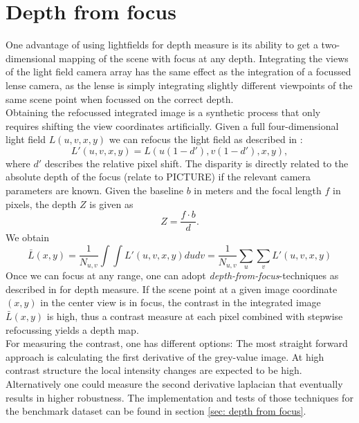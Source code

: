 \documentclass  [
  paper    = a4,
  BCOR     = 10mm,
  twoside,
  fontsize = 12pt,
  fleqn,
  toc      = bibnumbered,
  toc      = listofnumbered,
  numbers  = noendperiod,
  headings = normal,
  listof   = leveldown,
  version  = 3.03
]                                       {scrreprt}
\begin{document}
\section{Depth from focus}
\label{sec:theo depth}
One advantage of using lightfields for depth measure is its ability to get a two-dimensional mapping of the scene with focus at any depth. Integrating the views of the light field camera array has the same effect as the integration of a focussed lense camera, as the lense is simply integrating slightly different viewpoints of the same scene point when focussed on the correct depth. \\
 Obtaining the refocussed integrated image is a synthetic process that only requires shifting the view coordinates artificially. Given a full four-dimensional light field $L(u, v, x, y)$ we can refocus the light field as described in \cite{ng2005light}:
 \begin{equation}\label{eq:refocus}
L'(u, v, x, y) = L(u(1-d'), v(1-d'), x, y),
\end{equation}
where $d'$ describes the relative pixel shift. The disparity is directly related to the absolute depth of the focus (relate to PICTURE) if the relevant camera parameters are  known. Given the baseline $b$ in meters and the focal length $f$ in pixels, the depth $Z$ is given as \begin{equation}\label{key}
Z = \frac{f\cdot b}{d}.
\end{equation} 
We obtain
\begin{equation}\label{key}
\bar{L}(x,y) = \frac{1}{N_{u,v}}\int\int L'(u, v, x, y) du  dv =\frac{1}{N_{u,v}}\sum_{u}\sum_{v}  L'(u, v, x, y)
\end{equation}
Once we can focus at any range, one can adopt \textit{depth-from-focus}-techniques as described in \cite{watanabe1998rational} for depth measure. If the scene point at a given image coordinate $(x, y)$ in the center view is in focus, the contrast in the integrated image $\bar{L}(x,y)$ is high, thus a contrast measure at each pixel combined with stepwise refocussing yields a depth map. \\
For measuring the contrast, one has different options: The most straight forward approach is calculating the first derivative of the grey-value image. At high contrast structure the local intensity changes are expected to be high. Alternatively one could measure the second derivative laplacian that eventually results in higher robustness. The implementation and tests of those techniques for the benchmark dataset can be found in section \ref{sec: depth from focus}.\\
\end{document}

